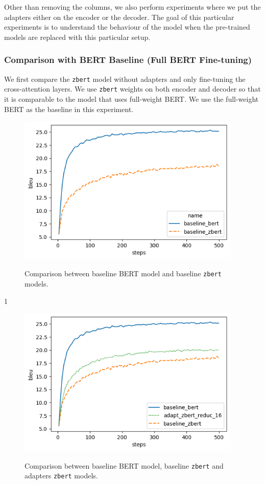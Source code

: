 Other than removing the columns, we also perform experiments where we put the adapters either on the encoder or the decoder. The goal of this particular experiments is to understand the behaviour of the model when the pre-trained models are replaced with this particular setup.

\subsubsection{Comparison with BERT Baseline (Full BERT Fine-tuning)}
We first compare the \texttt{zbert} model without adapters and only fine-tuning the cross-attention layers. We use \texttt{zbert} weights on both encoder and decoder so that it is comparable to the model that uses full-weight BERT. We use the full-weight BERT as the baseline in this experiment.

\begin{figure}[]
    {\includegraphics[width=0.95\textwidth]{img/baseline_zbert.png}}
    \centering
    \caption{Comparison between baseline BERT model and baseline \texttt{zbert} models.}
    \label{img:baseline_zbert}
\end{figure}1

\begin{figure}[]
    {\includegraphics[width=0.95\textwidth]{img/adapter_zbert.png}}
    \centering
    \caption{Comparison between baseline BERT model, baseline \texttt{zbert} and adapters \texttt{zbert} models.}
    \label{img:adapter_zbert}
\end{figure}

